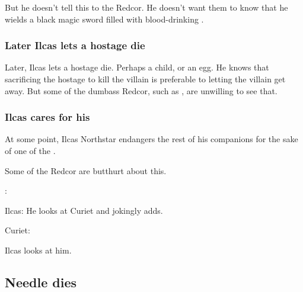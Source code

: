 \begin{garbage}
But he doesn't tell this to the Redcor. 
He doesn't want them to know that he wields a black magic sword filled with blood-drinking \daemons. 





\subsubsection{Later Ilcas lets a hostage die}
Later, Ilcas lets a hostage die. 
Perhaps a child, or an egg. 
He knows that sacrificing the hostage to kill the villain is preferable to letting the villain get away. 
But some of the dumbass Redcor, such as \Racel, are unwilling to see that. 





\subsubsection{Ilcas cares for his \nycans}
At some point, Ilcas Northstar endangers the rest of his companions for the sake of one of the \nycans. 

Some of the Redcor are butthurt about this.

\begin{prose}
\Esmerel: 

Ilcas: 
He looks at Curiet and jokingly adds.

Curiet:

Ilcas looks at him.
\end{prose}









\subsection{Needle dies}






\end{garbage}
